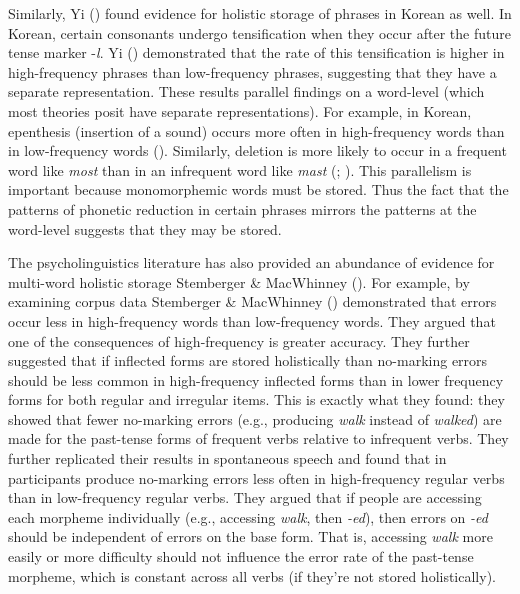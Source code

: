 \documentclass[
  12pt,
  letterpaper,
]{scrreprt}
\begin{document}
Similarly, Yi () found evidence for
holistic storage of phrases in Korean as well. In Korean, certain
consonants undergo tensification when they occur after the future tense
marker -\emph{l}. Yi () demonstrated
that the rate of this tensification is higher in high-frequency phrases
than low-frequency phrases, suggesting that they have a separate
representation. These results parallel findings on a word-level (which
most theories posit have separate representations). For example, in
Korean, epenthesis (insertion of a sound) occurs more often in
high-frequency words than in low-frequency words
(). Similarly, deletion is more likely to occur in a
frequent word like \emph{most} than in an infrequent word like
\emph{mast} (;
). This parallelism is important because monomorphemic words must
be stored. Thus the fact that the patterns of phonetic reduction in
certain phrases mirrors the patterns at the word-level suggests that
they may be stored.

The psycholinguistics literature has also provided an abundance of
evidence for multi-word holistic storage Stemberger \& MacWhinney
(). For
example, by examining corpus data Stemberger \& MacWhinney
()
demonstrated that errors occur less in high-frequency words than
low-frequency words. They argued that one of the consequences of
high-frequency is greater accuracy. They further suggested that if
inflected forms are stored holistically than no-marking errors should be
less common in high-frequency inflected forms than in lower frequency
forms for both regular and irregular items. This is exactly what they
found: they showed that fewer no-marking errors (e.g., producing
\emph{walk} instead of \emph{walked}) are made for the past-tense forms
of frequent verbs relative to infrequent verbs. They further replicated
their results in spontaneous speech and found that in participants
produce no-marking errors less often in high-frequency regular verbs
than in low-frequency regular verbs. They argued that if people are
accessing each morpheme individually (e.g., accessing \emph{walk}, then
\emph{-ed}), then errors on \emph{-ed} should be independent of errors
on the base form. That is, accessing \emph{walk} more easily or more
difficulty should not influence the error rate of the past-tense
morpheme, which is constant across all verbs (if they're not stored
holistically).
\end{document}
